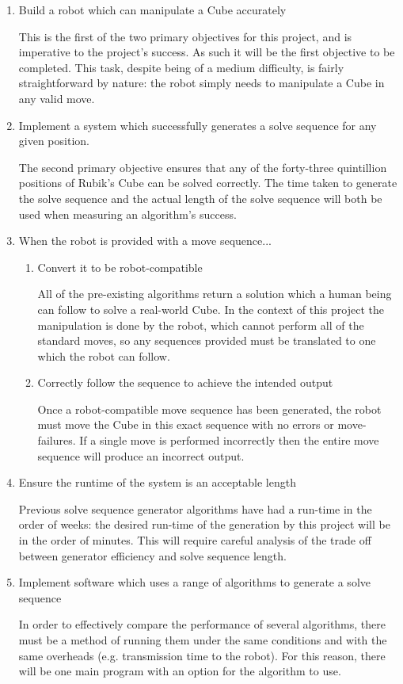 \documentclass{report}
\begin{document}
    \begin{enumerate}
    	\item Build a robot which can manipulate a Cube accurately \par This is the first of the two primary objectives for this project, and is imperative to the project's success. As such it will be the first objective to be completed. This task, despite being of a medium difficulty, is fairly straightforward by nature: the robot simply needs to manipulate a Cube in any valid move.
    	\item Implement a system which successfully generates a solve sequence for any given position. \par The second primary objective ensures that any of the forty-three quintillion positions of Rubik's Cube can be solved correctly. The time taken to generate the solve sequence and the actual length of the solve sequence will both be used when measuring an algorithm's success.
    	\item When the robot is provided with a move sequence...
    	\begin{enumerate}
    		\item Convert it to be robot-compatible \par All of the pre-existing algorithms return a solution which a human being can follow to solve a real-world Cube. In the context of this project the manipulation is done by the robot, which cannot perform all of the standard moves, so any sequences provided must be translated to one which the robot can follow.
    		\item Correctly follow the sequence to achieve the intended output \par Once a robot-compatible move sequence has been generated, the robot must move the Cube in this exact sequence with no errors or move-failures. If a single move is performed incorrectly then the entire move sequence will produce an incorrect output.
    	\end{enumerate}
    	\item Ensure the runtime of the system is an acceptable length \par Previous solve sequence generator algorithms have had a run-time in the order of weeks: the desired run-time of the generation by this project will be in the order of minutes. This will require careful analysis of the trade off between generator efficiency and solve sequence length.
    	\item Implement software which uses a range of algorithms to generate a solve sequence \par In order to effectively compare the performance of several algorithms, there must be a method of running them under the same conditions and with the same overheads (e.g. transmission time to the robot). For this reason, there will be one main program with an option for the algorithm to use.

\end{enumerate}
\end{document}
